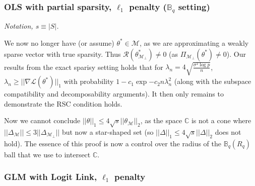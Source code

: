 \documentclass[11pt]{article}
\begin{document}


\subsubsection{OLS with partial sparsity, $\ell_1$ penalty ($\mathbb{B}_q$ setting)}

{\it Notation, $s\equiv|S|$.}\newline

We now no longer have (or assume) $\theta^* \in \mathcal{M}$, as we are approximating a weakly sparse vector with true sparsity. Thus $\mathcal{R}(\theta^*_{\mathcal{M}_\perp})\neq0$ (as $\Pi_{\mathcal{M_\perp}}(\theta^*)\neq 0$). Our results from the exact sparisy setting holds that for $\lambda_n = 4\sqrt{\frac{\sigma^2 \log p}{n}}$, $\lambda_n \geq ||\nabla\mathcal{L}(\theta^*)||_1$ with probability $1-c_1 \exp{-c_2n\lambda_n^2}$ (along with the subspace compatibility and decomposability arguments). It then only remains to demonstrate the RSC condition holds. \newline 

Now we cannot conclude $||\theta||_1 \leq 4\sqrt{s}||\theta_\mathcal{M}||_2$, as the space $\mathbb{C}$ is not a cone where $||\Delta_\mathcal{M}|| \leq 3||\Delta_{\mathcal{M}_\perp}||$ but now a star-shaped set (so $||\Delta||_1 \leq 4\sqrt{s}||\Delta||_2$ does not hold).  The essence of this proof is now a control over the radius of the $\mathbb{B}_q(R_q)$ ball that we use to intersect $\mathbb{C}$. 
\newline 


\subsubsection{GLM with Logit Link, $\ell_1$ penalty}
\end{document}
